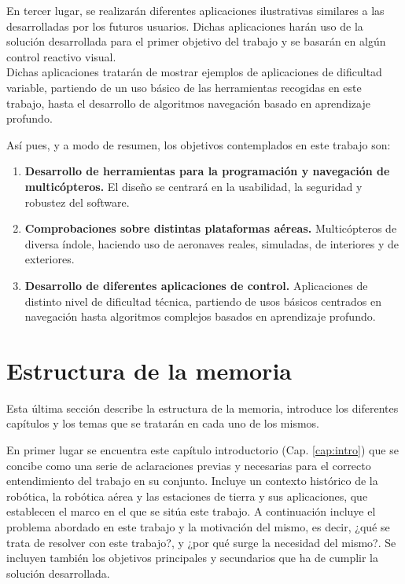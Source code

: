 \documentclass[../main.tex]{subfiles}
\begin{document}
En tercer lugar, se realizarán diferentes aplicaciones ilustrativas similares a las desarrolladas por los futuros usuarios. Dichas aplicaciones harán uso de la solución desarrollada para el primer objetivo del trabajo y se basarán en algún control reactivo visual. \\
Dichas aplicaciones tratarán de mostrar ejemplos de aplicaciones de dificultad variable, partiendo de un uso básico de las herramientas recogidas en este trabajo, hasta el desarrollo de algoritmos navegación basado en aprendizaje profundo.

Así pues, y a modo de resumen, los objetivos contemplados en este trabajo son:
\begin{enumerate}
    \item \textbf{Desarrollo de herramientas para la programación y navegación de multicópteros.} El diseño se centrará en la usabilidad, la seguridad y robustez del software.
    \item \textbf{Comprobaciones sobre distintas plataformas aéreas.} Multicópteros de diversa índole, haciendo uso de aeronaves reales, simuladas, de interiores y de exteriores.
    \item \textbf{Desarrollo de diferentes aplicaciones de control.} Aplicaciones de distinto nivel de dificultad técnica, partiendo de usos básicos centrados en navegación hasta algoritmos complejos basados en aprendizaje profundo.
\end{enumerate}

\section{Estructura de la memoria} \label{section:intro-estructura}
Esta última sección describe la estructura de la memoria, introduce los diferentes capítulos y los temas que se tratarán en cada uno de los mismos.

En primer lugar se encuentra este capítulo introductorio (Cap. \ref{cap:intro}) que se concibe como una serie de aclaraciones previas y necesarias para el correcto entendimiento del trabajo en su conjunto. Incluye un contexto histórico de la robótica, la robótica aérea y las estaciones de tierra y sus aplicaciones, que establecen el marco en el que se sitúa este trabajo. A continuación incluye el problema abordado en este trabajo y la motivación del mismo, es decir, ¿qué se trata de resolver con este trabajo?, y ¿por qué surge la necesidad del mismo?. Se incluyen también los objetivos principales y secundarios que ha de cumplir la solución desarrollada.
\end{document}
